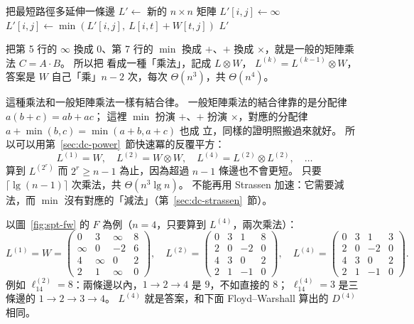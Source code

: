 \begin{pseudo}[label=alg:spt-extend]{把最短路徑多延伸一條邊}
    \State $L' \gets$ 新的 $n \times n$ 矩陣
            \State $L'[i, j] \gets \infty$
                \State $L'[i, j] \gets \min(L'[i, j],\ L[i, t] + W[t, j])$
            \EndFor
        \EndFor
    \EndFor
    \State \Return $L'$
\EndFunction
\end{pseudo}

把第 5 行的 $\infty$ 換成 $0$、第 7 行的 $\min$ 換成 $+$、$+$ 換成 $\times$，就是一般的矩陣乘
法 $C = A \cdot B$。 所以把  看成一種「乘法」，記成 $L \otimes W$，
$L^{(k)} = L^{(k-1)} \otimes W$，答案是 $W$ 自己「乘」$n - 2$ 次，每次 $\Theta(n^3)$，共
$\Theta(n^4)$。

這種乘法和一般矩陣乘法一樣有結合律。 一般矩陣乘法的結合律靠的是分配律 $a(b + c) = ab + ac$；
這裡 $\min$ 扮演 $+$、$+$ 扮演 $\times$，對應的分配律 $a + \min(b, c) = \min(a + b, a + c)$ 也成
立，同樣的證明照搬過來就好。 所以可以用第~\ref{sec:dc-power}~節快速冪的反覆平方：
\[
L^{(1)} = W,\quad L^{(2)} = W \otimes W,\quad L^{(4)} = L^{(2)} \otimes L^{(2)},\quad \ldots
\]
算到 $L^{(2^r)}$ 而 $2^r \ge n - 1$ 為止，因為超過 $n - 1$ 條邊也不會更短。 只要
$\lceil \lg(n - 1) \rceil$ 次乘法，共 $\Theta(n^3 \lg n)$。 不能再用 Strassen 加速：它需要減
法，而 $\min$ 沒有對應的「減法」（第~\ref{sec:dc-strassen}~節）。

以圖~\ref{fig:spt-fw} 的 $F$ 為例（$n = 4$，只要算到 $L^{(4)}$，兩次乘法）：
\[
L^{(1)} = W = \begin{pmatrix} 0 & 3 & \infty & 8 \\ \infty & 0 & -2 & 6 \\ 4 & \infty & 0 & 2 \\ 2 & 1 & \infty & 0 \end{pmatrix},\quad
L^{(2)} = \begin{pmatrix} 0 & 3 & 1 & 8 \\ 2 & 0 & -2 & 0 \\ 4 & 3 & 0 & 2 \\ 2 & 1 & -1 & 0 \end{pmatrix},\quad
L^{(4)} = \begin{pmatrix} 0 & 3 & 1 & 3 \\ 2 & 0 & -2 & 0 \\ 4 & 3 & 0 & 2 \\ 2 & 1 & -1 & 0 \end{pmatrix}.
\]
例如 $\ell_{14}^{(2)} = 8$：兩條邊以內，$1 \to 2 \to 4$ 是 $9$，不如直接的 $8$；
$\ell_{14}^{(4)} = 3$ 是三條邊的 $1 \to 2 \to 3 \to 4$。 $L^{(4)}$ 就是答案，和下面
Floyd--Warshall 算出的 $D^{(4)}$ 相同。

